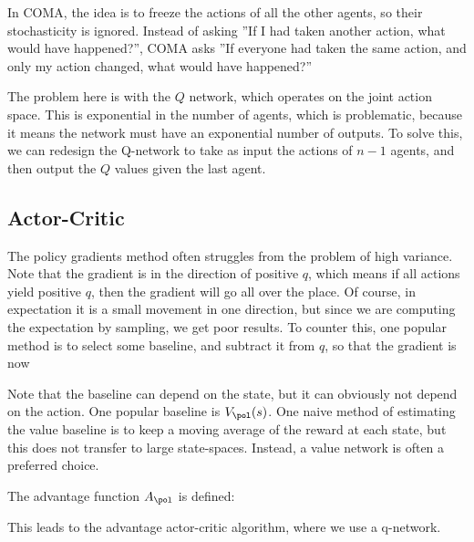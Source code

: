 \documentclass[12pt]{article}
\begin{document}
In COMA, the idea is to freeze the actions of all the other agents, so their stochasticity is ignored. Instead of asking ''If I had taken another action, what would have happened?'', COMA asks ''If everyone had taken the same action, and only my action changed, what would have happened?''


The problem here is with the $Q$ network, which operates on the joint action space. This is exponential in the number of agents, which is problematic, because it means the network must have an exponential number of outputs. To solve this, we can redesign the Q-network to take as input the actions of $n-1$ agents, and then output the $Q$ values given the last agent. 

\subsection{Actor-Critic}

The policy gradients method often struggles from the problem of high variance. Note that the gradient is in the direction of positive $q$, which means if all actions yield positive $q$, then the gradient will go all over the place. Of course, in expectation it is a small movement in one direction, but since we are computing the expectation by sampling, we get poor results. To counter this, one popular method is to select some baseline, and subtract it from $q$, so that the gradient is now


Note that the baseline can depend on the state, but it can obviously not depend on the action. One popular baseline is $V_{\pol}(s)$. One naive method of estimating the value baseline is to keep a moving average of the reward at each state, but this does not transfer to large state-spaces. Instead, a value network is often a preferred choice.

The advantage function $A_{\pol}$ is defined:


This leads to the advantage actor-critic algorithm, where we use a q-network.
\end{document}
